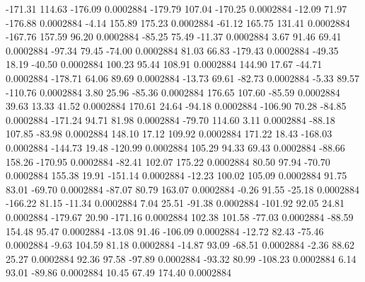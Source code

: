      -171.31      114.63     -176.09     0.0002884
     -179.79      107.04     -170.25     0.0002884
      -12.09       71.97     -176.88     0.0002884
       -4.14      155.89      175.23     0.0002884
      -61.12      165.75      131.41     0.0002884
     -167.76      157.59       96.20     0.0002884
      -85.25       75.49      -11.37     0.0002884
        3.67       91.46       69.41     0.0002884
      -97.34       79.45      -74.00     0.0002884
       81.03       66.83     -179.43     0.0002884
      -49.35       18.19      -40.50     0.0002884
      100.23       95.44      108.91     0.0002884
      144.90       17.67      -44.71     0.0002884
     -178.71       64.06       89.69     0.0002884
      -13.73       69.61      -82.73     0.0002884
       -5.33       89.57     -110.76     0.0002884
        3.80       25.96      -85.36     0.0002884
      176.65      107.60      -85.59     0.0002884
       39.63       13.33       41.52     0.0002884
      170.61       24.64      -94.18     0.0002884
     -106.90       70.28      -84.85     0.0002884
     -171.24       94.71       81.98     0.0002884
      -79.70      114.60        3.11     0.0002884
      -88.18      107.85      -83.98     0.0002884
      148.10       17.12      109.92     0.0002884
      171.22       18.43     -168.03     0.0002884
     -144.73       19.48     -120.99     0.0002884
      105.29       94.33       69.43     0.0002884
      -88.66      158.26     -170.95     0.0002884
      -82.41      102.07      175.22     0.0002884
       80.50       97.94      -70.70     0.0002884
      155.38       19.91     -151.14     0.0002884
      -12.23      100.02      105.09     0.0002884
       91.75       83.01      -69.70     0.0002884
      -87.07       80.79      163.07     0.0002884
       -0.26       91.55      -25.18     0.0002884
     -166.22       81.15      -11.34     0.0002884
        7.04       25.51      -91.38     0.0002884
     -101.92       92.05       24.81     0.0002884
     -179.67       20.90     -171.16     0.0002884
      102.38      101.58      -77.03     0.0002884
      -88.59      154.48       95.47     0.0002884
      -13.08       91.46     -106.09     0.0002884
      -12.72       82.43      -75.46     0.0002884
       -9.63      104.59       81.18     0.0002884
      -14.87       93.09      -68.51     0.0002884
       -2.36       88.62       25.27     0.0002884
       92.36       97.58      -97.89     0.0002884
      -93.32       80.99     -108.23     0.0002884
        6.14       93.01      -89.86     0.0002884
       10.45       67.49      174.40     0.0002884

